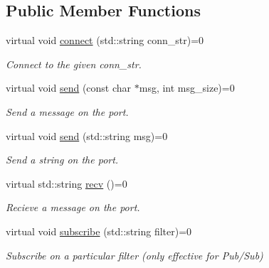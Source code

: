 \subsection*{Public Member Functions}
\begin{DoxyCompactItemize}
\item 
\hypertarget{classZmqOut_ae34b1742c72e0c82ea42315cb68f1a20}{virtual void \hyperlink{classZmqOut_ae34b1742c72e0c82ea42315cb68f1a20}{connect} (std\-::string conn\-\_\-str)=0}\label{classZmqOut_ae34b1742c72e0c82ea42315cb68f1a20}

\begin{DoxyCompactList}\small\item\em Connect to the given conn\-\_\-str. \end{DoxyCompactList}\item 
\hypertarget{classZmqOut_a97935d9e7cbacd2fcb9655433e4b7af4}{virtual void \hyperlink{classZmqOut_a97935d9e7cbacd2fcb9655433e4b7af4}{send} (const char $\ast$msg, int msg\-\_\-size)=0}\label{classZmqOut_a97935d9e7cbacd2fcb9655433e4b7af4}

\begin{DoxyCompactList}\small\item\em Send a message on the port. \end{DoxyCompactList}\item 
\hypertarget{classZmqOut_ac7b314ddf6e0357c31b05fb2b1b91635}{virtual void \hyperlink{classZmqOut_ac7b314ddf6e0357c31b05fb2b1b91635}{send} (std\-::string msg)=0}\label{classZmqOut_ac7b314ddf6e0357c31b05fb2b1b91635}

\begin{DoxyCompactList}\small\item\em Send a string on the port. \end{DoxyCompactList}\item 
\hypertarget{classZmqOut_a02da5e5dd51f99e7d35a3f843b9bd00e}{virtual std\-::string \hyperlink{classZmqOut_a02da5e5dd51f99e7d35a3f843b9bd00e}{recv} ()=0}\label{classZmqOut_a02da5e5dd51f99e7d35a3f843b9bd00e}

\begin{DoxyCompactList}\small\item\em Recieve a message on the port. \end{DoxyCompactList}\item 
\hypertarget{classZmqOut_a1183a7e64e76deaa0262cb1fc7853af5}{virtual void \hyperlink{classZmqOut_a1183a7e64e76deaa0262cb1fc7853af5}{subscribe} (std\-::string filter)=0}\label{classZmqOut_a1183a7e64e76deaa0262cb1fc7853af5}

\begin{DoxyCompactList}\small\item\em Subscribe on a particular filter (only effective for Pub/\-Sub) \end{DoxyCompactList}\end{DoxyCompactItemize}


